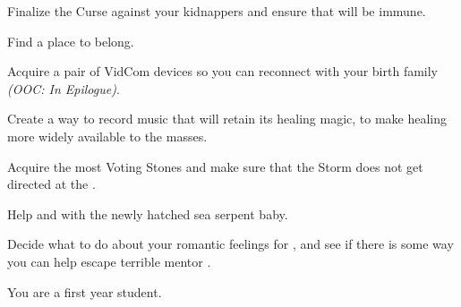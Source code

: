 \documentclass[char]{GL2020}
\begin{document}
\begin{itemz}
    \item Finalize the Curse against your kidnappers and ensure that \cMusic{} will be immune.
    \item Find a place to belong.
    \item Acquire a pair of VidCom devices so you can reconnect with your birth family \emph{(OOC: In Epilogue)}.
    \item Create a way to record music that will retain its healing magic, to make healing more widely available to the masses.
    \item Acquire the most Voting Stones and make sure that the Storm does not get directed at the \pFarm{}.
    \item Help \cPirateChild{} and \cDisney{} with the newly hatched sea serpent baby.
    \item Decide what to do about your romantic feelings for \cScholarship{}, and see if there is some way you can help \cScholarship{\them} escape \cScholarship{\their} terrible mentor \cAntiChup{}.
\end{itemz}

\begin{itemz}[Notes]
    \item You are a first year student.
\end{itemz}
\end{document}
